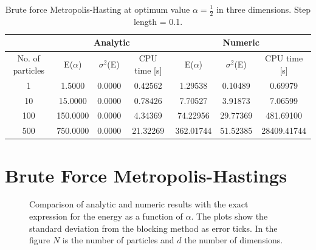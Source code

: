 \documentclass[
    a4paper, aps, twocolumn, floatfix, superscriptaddress, nofootinbib]{revtex4-1}
\newcommand{\1}{\mathds{1}}
\begin{document}
	\begin{table}[ht]
		\centering
		\caption{Brute force Metropolis-Hasting at optimum value $\alpha = \frac{1}{2}$ in three dimensions. Step length = 0.1.}
		\begin{tabular}{c|ccc|ccc}
			  & \multicolumn{3}{c|}{Analytic} & \multicolumn{3}{c}{Numeric} \\ \hline
			No. of particles & E($\alpha$) & $\sigma^2$(E) & CPU time [s] & E($\alpha$) & $\sigma^2$(E) & CPU time [s] \\ \hline
			1					 	&   1.5000		  & 0.0000			&  0.42562		& 1.29538		 & 0.10489		   & 0.69979  \\
			10						&  15.0000	  & 0.0000			&  0.78426 		& 7.70527		 & 3.91873		   & 7.06599	 \\
			100					&  150.0000	  & 0.0000			&  4.34369		& 74.22956 	 & 29.77369		   & 481.69100 \\
			500					&	750.0000	  & 0.0000			&  21.32269		& 362.01744	 & 51.52385         & 28409.41744\\ \hline
		\end{tabular}
	\end{table}

\appendix
\section{Brute Force Metropolis-Hastings}

    \begin{figure}
        \caption{Comparison of analytic and numeric results with the exact
        expression for the energy as a function of $\alpha$. The plots show the
        standard deviation from the blocking method as error ticks. In the
        figure $N$ is the number of particles and $d$ the number of dimensions.}
        \label{fig:initial_problem_b}
    \end{figure}



\end{document}
